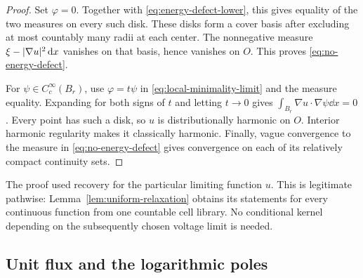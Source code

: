 \begin{proof}
Set \(\varphi=0\).  Together with
\eqref{eq:energy-defect-lower}, this gives equality of the two measures
on every such disk.  These disks form a cover basis after excluding
at most countably many radii at each center.  The nonnegative measure
\(\xi-\lvert \nabla u\rvert^2\,\mathrm d x\) vanishes on that basis, hence vanishes
on \(O\).  This proves \eqref{eq:no-energy-defect}.

For \(\psi\in C_c^\infty(B_r)\), use
\(\varphi=t\psi\) in \eqref{eq:local-minimality-limit} and the measure
equality.  Expanding for both signs of \(t\) and letting \(t\to0\)
gives
\(\int_{B_r}\nabla u\cdot\nabla\psi\dd x=0\).
Every point has such a disk, so \(u\) is distributionally harmonic on
\(O\).  Interior harmonic regularity makes it classically harmonic.
Finally, vague convergence to the measure in
\eqref{eq:no-energy-defect} gives convergence on each of its relatively
compact continuity sets.
\end{proof}

The proof used recovery for the particular limiting function \(u\).
This is legitimate pathwise: Lemma~\ref{lem:uniform-relaxation} obtains
its statements for every continuous function from one countable cell
library.  No conditional kernel depending on the subsequently chosen
voltage limit is needed.

\subsection{Unit flux and the logarithmic poles}

